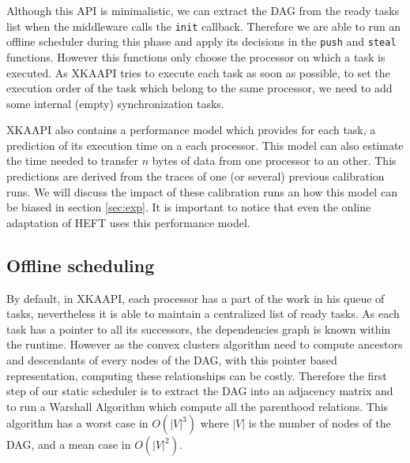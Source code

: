 \documentclass[10pt, conference, compsocconf,pdftex,dvipsnames]{IEEEtran}
\begin{document}
Although this API is minimalistic, we can extract the DAG from the ready tasks
list when the middleware calls the \texttt{init} callback. Therefore we are
able to run an offline scheduler during this phase and apply its decisions in
the \texttt{push} and \texttt{steal} functions.  However this functions only
choose the processor on which a task is executed. As XKAAPI tries to execute
each task as soon as possible, to set the execution order of the task which
belong to the same processor, we need to add some internal (empty)
synchronization tasks.

XKAAPI also contains a performance model which provides for each task, a
prediction of its execution time on a each processor. This model can also
estimate the time needed to transfer $n$ bytes of data from one processor to
an other. This predictions are derived from the traces of one (or several)
previous calibration runs. We will discuss the impact of these calibration
runs an how this model can be biased in section \ref{sec:exp}. It is important
to notice that even the online adaptation of HEFT uses this performance model.

\subsection{Offline scheduling}
\label{sec:impl-off}
By default, in XKAAPI, each processor has a part of the work in his queue of
tasks, nevertheless it is able to maintain a centralized list of ready tasks.
As each task has a pointer to all its successors, the dependencies graph is
known within the runtime. However as the convex clusters algorithm need to
compute ancestors and descendants of every nodes of the DAG, with this pointer
based representation, computing these relationships can be costly. Therefore
the first step of our static scheduler is to extract the DAG into an adjacency
matrix and to run a Warshall Algorithm which compute all the parenthood
relations. This algorithm has a worst case in $O(|V|^3)$ where $|V|$ is the
number of nodes of the DAG, and a mean case in $O(|V|^2)$.
\end{document}
